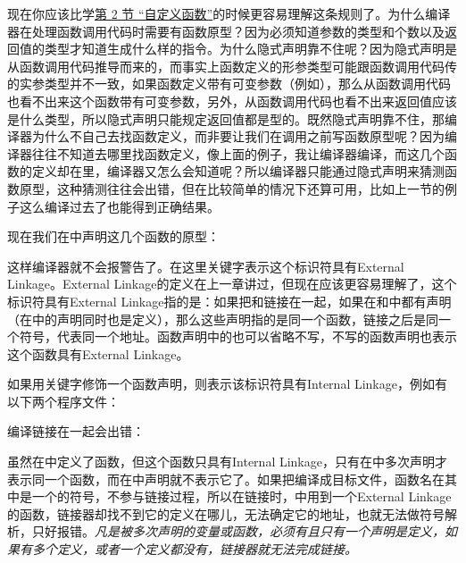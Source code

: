 现在你应该比学\hyperlink{db.ch03s02.id2712975}{第 2 节 “自定义函数”}的时候更容易理解这条规则了。为什么编译器在处理函数调用代码时需要有函数原型？因为必须知道参数的类型和个数以及返回值的类型才知道生成什么样的指令。为什么隐式声明靠不住呢？因为隐式声明是从函数调用代码推导而来的，而事实上函数定义的形参类型可能跟函数调用代码传的实参类型并不一致，如果函数定义带有可变参数（例如），那么从函数调用代码也看不出来这个函数带有可变参数，另外，从函数调用代码也看不出来返回值应该是什么类型，所以隐式声明只能规定返回值都是型的。既然隐式声明靠不住，那编译器为什么不自己去找函数定义，而非要让我们在调用之前写函数原型呢？因为编译器往往不知道去哪里找函数定义，像上面的例子，我让编译器编译，而这几个函数的定义却在里，编译器又怎么会知道呢？所以编译器只能通过隐式声明来猜测函数原型，这种猜测往往会出错，但在比较简单的情况下还算可用，比如上一节的例子这么编译过去了也能得到正确结果。



现在我们在中声明这几个函数的原型：




这样编译器就不会报警告了。在这里关键字表示这个标识符具有External Linkage。External Linkage的定义在上一章讲过，但现在应该更容易理解了，这个标识符具有External Linkage指的是：如果把和链接在一起，如果在和中都有声明（在中的声明同时也是定义），那么这些声明指的是同一个函数，链接之后是同一个符号，代表同一个地址。函数声明中的也可以省略不写，不写的函数声明也表示这个函数具有External Linkage。



如果用关键字修饰一个函数声明，则表示该标识符具有Internal Linkage，例如有以下两个程序文件：





编译链接在一起会出错：




虽然在中定义了函数，但这个函数只具有Internal Linkage，只有在中多次声明才表示同一个函数，而在中声明就不表示它了。如果把编译成目标文件，函数名在其中是一个的符号，不参与链接过程，所以在链接时，中用到一个External Linkage的函数，链接器却找不到它的定义在哪儿，无法确定它的地址，也就无法做符号解析，只好报错。\emph{凡是被多次声明的变量或函数，必须有且只有一个声明是定义，如果有多个定义，或者一个定义都没有，链接器就无法完成链接。}



